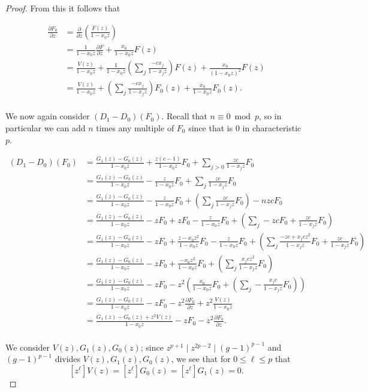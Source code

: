 \documentclass{article}
\numberwithin{equation}{section}
\begin{document}
\begin{proof}
From this it follows that

\begin{align*}
\frac{\partial F_0}{\partial z} &= \frac{\partial}{\partial z}\left(\frac{F(z)}{1-x_0z}\right)\\
&=\frac{1}{1-x_0z} \frac{\partial F}{\partial z}+\frac{x_0}{1-x_0z} F(z)\\
&=\frac{V(z)}{1-x_0z}+\frac{1}{1-x_0z}\left(\sum_j \frac{-cx_j}{1-x_jz}\right)F(z)+\frac{x_0}{(1-x_0z)^2} F(z)\\
&=\frac{V(z)}{1-x_0z}+\left(\sum_j \frac{-cx_j}{1-x_jz}\right)F_0(z)+\frac{x_0}{1-x_0z} F_0(z).\\
\end{align*}

We now again consider $(D_1-D_0)(F_0)$. Recall that $n \equiv 0 \bmod p$, so in particular we can add $n$ times any multiple of $F_0$ since that is $0$ in characteristic $p$. 

\begin{align*}
(D_1-D_0)(F_0)&=\frac{G_1(z)-G_0(z)}{1-x_0z}+\frac{z(c-1)}{1-x_0z}F_0+\sum_{j>0} \frac{zc}{1-x_jz}F_0\\
&=\frac{G_1(z)-G_0(z)}{1-x_0z}-\frac{z}{1-x_0z}F_0+\sum_{j} \frac{zc}{1-x_jz}F_0\\
&=\frac{G_1(z)-G_0(z)}{1-x_0z}-\frac{z}{1-x_0z}F_0+\left(\sum_{j} \frac{zc}{1-x_jz}F_0\right)-nzcF_0\\
&=\frac{G_1(z)-G_0(z)}{1-x_0z}-zF_0+zF_0-\frac{z}{1-x_0z}F_0+\left(\sum_{j} -zcF_0+\frac{zc}{1-x_jz}F_0\right)\\
&=\frac{G_1(z)-G_0(z)}{1-x_0z}-zF_0+\frac{z-x_0z^2}{1-x_0z}F_0-\frac{z}{1-x_0z}F_0+\left(\sum_{j} \frac{-zc+x_jcz^2}{1-x_jz}F_0+\frac{zc}{1-x_jz}F_0\right)\\
&=\frac{G_1(z)-G_0(z)}{1-x_0z}-zF_0+\frac{-x_0z^2}{1-x_0z}F_0+\left(\sum_{j} \frac{x_jcz^2}{1-x_jz}F_0\right)\\
&=\frac{G_1(z)-G_0(z)}{1-x_0z}-zF_0-z^2\left(\frac{x_0}{1-x_0z}F_0+\left(\sum_{j}- \frac{x_jc}{1-x_jz}F_0\right)\right)\\
&=\frac{G_1(z)-G_0(z)}{1-x_0z}-zF_0-z^2\frac{\partial F_0}{\partial z}+z^2\frac{V(z)}{1-x_0z}\\
&=\frac{G_1(z)-G_0(z)+z^2V(z)}{1-x_0z}-zF_0-z^2\frac{\partial F_0}{\partial z}.\\
\end{align*}

We consider $V(z),G_1(z),G_0(z)$; since $z^{p+1} \mid z^{2p-2} \mid (g-1)^{p-1}$ and $(g-1)^{p-1}$ divides $V(z),G_1(z),G_0(z)$, we see that for $0 \le \ell \le p$ that $$[z^\ell]V(z)=[z^\ell]G_0(z)=[z^\ell]G_1(z)=0.$$


\end{proof}
\end{document}
